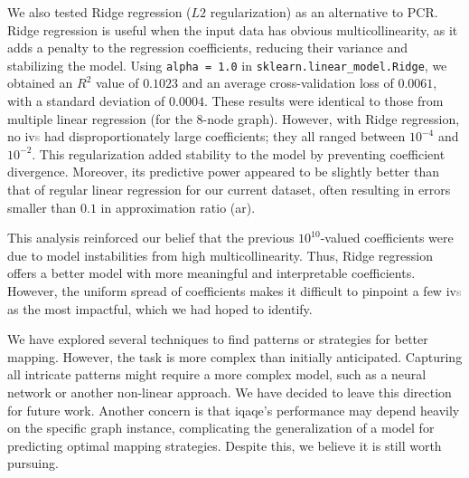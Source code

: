 We also tested Ridge regression ($L2$ regularization) as an alternative to PCR. Ridge regression is useful when the input data has obvious multicollinearity, as it adds a penalty to the regression coefficients, reducing their variance and stabilizing the model. Using \texttt{alpha = 1.0} in \texttt{sklearn.linear\_model.Ridge}, we obtained an \(R^2\) value of $0.1023$ and an average cross-validation loss of $0.0061$, with a standard deviation of $0.0004$. These results were identical to those from multiple linear regression (for the $8$-node graph). However, with Ridge regression, no \acrshort{iv}\textcolor{gray}{s} had disproportionately large coefficients; they all ranged between \(10^{-4}\) and \(10^{-2}\). This regularization added stability to the model by preventing coefficient divergence. Moreover, its predictive power appeared to be slightly better than that of regular linear regression for our current dataset, often resulting in errors smaller than $0.1$ in approximation ratio (\acrshort{ar}).

This analysis reinforced our belief that the previous \(10^{10}\)-valued coefficients were due to model instabilities from high multicollinearity. Thus, Ridge regression offers a better model with more meaningful and interpretable coefficients. However, the uniform spread of coefficients makes it difficult to pinpoint a few \acrshort{iv}\textcolor{gray}{s} as the most impactful, which we had hoped to identify.

We have explored several techniques to find patterns or strategies for better mapping. However, the task is more complex than initially anticipated. Capturing all intricate patterns might require a more complex model, such as a neural network or another non-linear approach. We have decided to leave this direction for future work. Another concern is that \acrshort{iqaqe}'s performance may depend heavily on the specific graph instance, complicating the generalization of a model for predicting optimal mapping strategies. Despite this, we believe it is still worth pursuing.




